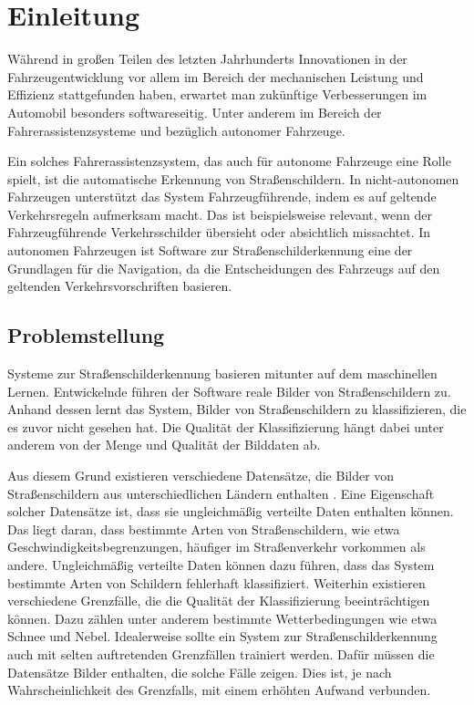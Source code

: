 \chapter{Einleitung}
Während in großen Teilen des letzten Jahrhunderts Innovationen in der Fahrzeugentwicklung vor allem im Bereich der mechanischen Leistung und Effizienz stattgefunden haben, erwartet man zukünftige Verbesserungen im Automobil besonders softwareseitig. Unter anderem im Bereich der Fahrerassistenzsysteme und bezüglich autonomer Fahrzeuge. \cite{Staron2021}

Ein solches Fahrerassistenzsystem, das auch für autonome Fahrzeuge eine Rolle spielt, ist die automatische Erkennung von Straßenschildern. In nicht-autonomen Fahrzeugen unterstützt das System Fahrzeugführende, indem es auf geltende Verkehrsregeln aufmerksam macht. Das ist beispielsweise relevant, wenn der Fahrzeugführende Verkehrsschilder übersieht oder absichtlich missachtet. In autonomen Fahrzeugen ist Software zur Straßenschilderkennung eine der Grundlagen für die Navigation, da die Entscheidungen des Fahrzeugs auf den geltenden Verkehrsvorschriften basieren. \cite{traffic-sign-detection-review-2014}

\section{Problemstellung}

Systeme zur Straßenschilderkennung basieren mitunter auf dem maschinellen Lernen. Entwickelnde führen der Software reale Bilder von Straßenschildern zu. Anhand dessen lernt das System, Bilder von Straßenschildern zu klassifizieren, die es zuvor nicht gesehen hat. Die Qualität der Klassifizierung hängt dabei unter anderem von der Menge und Qualität der Bilddaten ab. \cite{traffic-sign-detection-review-2014}

Aus diesem Grund existieren verschiedene Datensätze, die Bilder von Straßenschildern aus unterschiedlichen Ländern enthalten \cite{GTSRB}. Eine Eigenschaft solcher Datensätze ist, dass sie ungleichmäßig verteilte Daten enthalten können. Das liegt daran, dass bestimmte Arten von Straßenschildern, wie etwa Geschwindigkeitsbegrenzungen, häufiger im Straßenverkehr vorkommen als andere. Ungleichmäßig verteilte Daten können dazu führen, dass das System bestimmte Arten von Schildern fehlerhaft klassifiziert. Weiterhin existieren verschiedene Grenzfälle, die die Qualität der Klassifizierung beeinträchtigen können. Dazu zählen unter anderem bestimmte Wetterbedingungen wie etwa Schnee und Nebel. Idealerweise sollte ein System zur Straßenschilderkennung auch mit selten auftretenden Grenzfällen trainiert werden. Dafür müssen die Datensätze Bilder enthalten, die solche Fälle zeigen. Dies ist, je nach Wahrscheinlichkeit des Grenzfalls, mit einem erhöhten Aufwand verbunden.

